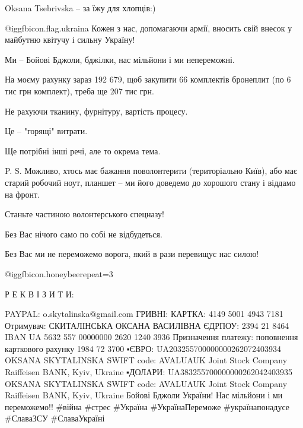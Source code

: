 Oksana Tsebrivska -- за їжу для хлопців:)

@igg{fbicon.flag.ukraina} Кожен з нас, допомагаючи армії, вносить свій внесок у
майбутню квітучу і сильну Україну! 

Ми -- Бойові Бджоли, бджілки, нас мільйони і ми непереможні.


На моєму рахунку зараз 192 679, щоб закупити 66 комплектів бронеплит (по 6 тис грн комплект), треба ще 207 тис грн. 

Не рахуючи тканину, фурнітуру, вартість процесу. 

Це -- "горящі" витрати.

Ще потрібні інші речі, але то окрема тема.

P. S. Можливо, хтось має бажання поволонтерити (територіально Київ), або має
старий робочий ноут, планшет -- ми його доведемо до хорошого стану і віддамо на
фронт.

Станьте частиною волонтерського спецназу!

Без Вас нічого само по собі не відбудеться.

Без Вас ми не переможемо ворога, який в рази перевищує нас силою!

 @igg{fbicon.honeybee}{repeat=3} 

Р Е К В І З И Т И:

\obeycr
PAYPAL: o.skytalinska@gmail.com
ГРИВНІ: КАРТКА: 4149  5001  4943  7181
Отримувач: СКИТАЛІНСЬКА ОКСАНА ВАСИЛІВНА
ЄДРПОУ: 2394 21 8464
IBAN UA 5632  557  00000000 2620 1240 3936
Призначення платежу: поповнення карткового рахунку 1984 72 3700 
▪️ЄВРО:
UA203255700000000262072403934 
OKSANA SKYTALINSKA
SWIFT code: AVALUAUK Joint Stock Company Raiffeisen BANK, Kyiv, Ukraine
▪️ДОЛАРИ:
UA383255700000000262042403935 OKSANA SKYTALINSKA
SWIFT code: AVALUAUK Joint Stock Company Raiffeisen BANK, Kyiv, Ukraine
Бойові Бджоли України! Нас мільйони і ми переможемо!!
\#війна \#стрес \#Україна \#УкраїнаПереможе \#українапонадусе \#СлаваЗСУ \#СлаваУкраїні
\restorecr

